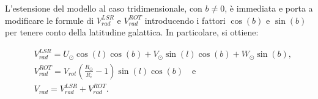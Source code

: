 \documentclass[twocolumn]{article}
\begin{document}
L'estensione del modello al caso tridimensionale, con $b \neq 0$, è immediata e porta a modificare le formule di $V_{rad}^{LSR}$ e $V_{rad}^{ROT}$ introducendo i fattori $\cos(b)$ e $\sin(b)$ per tenere conto della latitudine galattica. In particolare, si ottiene:

\begin{align*}
    &V_{rad}^{LSR} = U_\odot \cos(l) \cos(b) + V_\odot \sin(l) \cos(b) + W_\odot \sin(b)\text{,}\\
    &V_{rad}^{ROT} = V_{rot} \left( \frac{R_\odot}{R_i} - 1 \right) \sin(l) \cos(b)\quad\text{e}\\
    &V_{rad} = V_{rad}^{LSR} + V_{rad}^{ROT}.
\end{align*}

\end{document}
